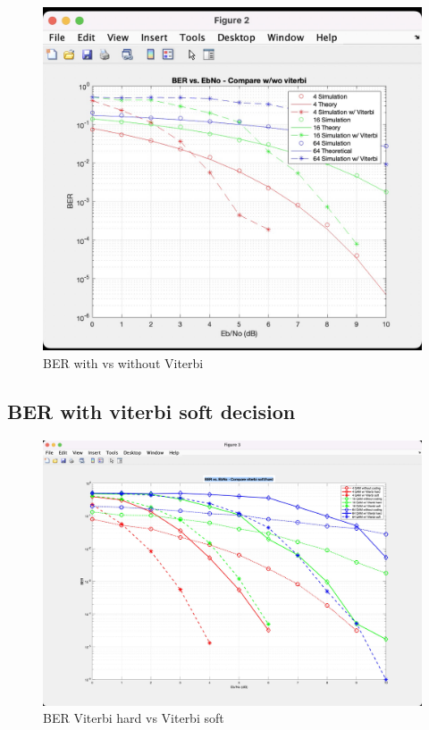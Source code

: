 \documentclass[12pt]{article}
\begin{document}
\begin{figure}[ht]
    \includegraphics[width=\textwidth]{hard}
    \caption{BER with vs without Viterbi}
\end{figure}

\subsection{BER with viterbi soft decision}


\begin{figure}[ht]
    \includegraphics[width=\textwidth]{soft}
    \caption{BER Viterbi hard vs Viterbi soft}
\end{figure}
\end{document}
